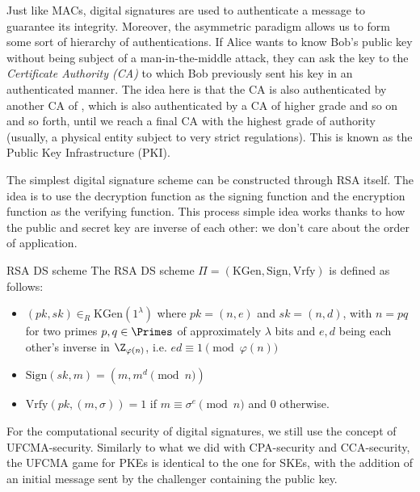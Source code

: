 \documentclass[a4paper, 12pt]{report}
\begin{document}
    Just like MACs, digital signatures are used to authenticate a message to guarantee its integrity. Moreover, the asymmetric paradigm allows us to form some sort of hierarchy of authentications. If Alice wants to know Bob's public key without being subject of a man-in-the-middle attack, they can ask the key to the \textit{Certificate Authority (CA)} to which Bob previously sent his key in an authenticated manner. The idea here is that the CA is also authenticated by another CA of , which is also authenticated by a CA of higher grade and so on and so forth, until we reach a final CA with the highest grade of authority (usually, a physical entity subject to very strict regulations). This is known as the Public Key Infrastructure (PKI).

    The simplest digital signature scheme can be constructed through RSA itself. The idea is to use the decryption function as the signing function and the encryption function as the verifying function. This process simple idea works thanks to how the public and secret key are inverse of each other: we don't care about the order of application.

    \begin{framedalgo}{RSA DS scheme}
        The RSA DS scheme $\Pi = (\mathrm{KGen}, \mathrm{Sign}, \mathrm{Vrfy})$ is defined as follows:
        \begin{itemize}
            \item $ (pk, sk) \in_R \mathrm{KGen}(1^{\lambda})$ where $pk = (n,e)$ and $sk = (n,d)$, with $n = pq$ for two primes $p,q \in \Primes$ of approximately $\lambda$ bits and $e,d$ being each other's inverse in $\Z_{\varphi(n)}$, i.e. $ed \equiv 1 \pmod{\varphi(n)}$
            \item $\mathrm{Sign}(sk, m) = (m, m^d \pmod n)$
            \item $\mathrm{Vrfy}(pk, (m, \sigma)) = 1$ if $m \equiv \sigma^e \pmod n$ and $0$ otherwise.
        \end{itemize}
    \end{framedalgo}

    For the computational security of digital signatures, we still use the concept of UFCMA-security. Similarly to what we did with CPA-security and CCA-security, the UFCMA game for PKEs is identical to the one for SKEs, with the addition of an initial message sent by the challenger containing the public key. 
    
\end{document}
